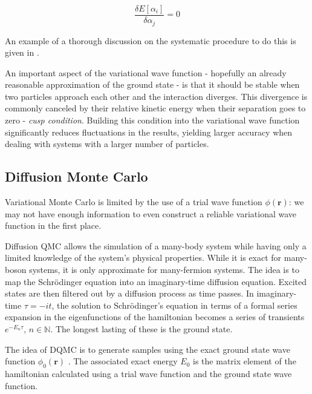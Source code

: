 \documentclass[10pt, twocolumn, twoside]{article}
\begin{document}
\begin{equation}
\frac{\delta E[\alpha_i]}{\delta \alpha_j} = 0
\end{equation}

An example of a thorough discussion on the systematic procedure to do this is given in \cite{umrigar}.\par

An important aspect of the variational wave function - hopefully an already  reasonable approximation of the ground state - is that it should be stable when two particles approach each other and the interaction diverges. This divergence is commonly canceled by their relative kinetic energy when their separation goes to zero - \emph{cusp condition}\cite{mahan}. Building this condition into the variational wave function significantly reduces fluctuations in the results, yielding larger accuracy when dealing with systems with a larger number of particles.


\subsection{Diffusion Monte Carlo}\label{subsec:dmc}

Variational Monte Carlo is limited by the use of a trial wave function $\phi (\bm r)$: we may not have enough information to even construct a reliable variational wave function in the first place. \cite{tao}\par

Diffusion QMC allows the simulation of a many-body system while having only a limited knowledge of the system's physical properties. While it is exact for many-boson systems, it is only approximate for many-fermion systems. The idea is to map the Schr\"odinger equation into  an imaginary-time diffusion equation. Excited states are then filtered out by a diffusion process as time passes. In imaginary-time $\tau = - i t$, the solution to Schr\"odinger's equation in terms of a formal series expansion in the eigenfunctions of the hamiltonian becomes a series of transients $e^{-E_n \tau}, \, n \in \mathbb{N}$. The longest lasting of these is the ground state. \cite{kosztin} \par

The idea of DQMC is to generate samples using the exact ground state wave function $\phi_0 (\bm r)$ \cite{vmc}. The associated exact energy $E_0$ is the matrix element of the hamiltonian calculated using a trial wave function and the ground state wave function.
\end{document}
